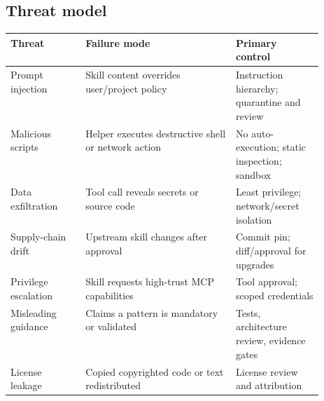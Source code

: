 \documentclass[11pt,letterpaper]{article}
\begin{document}
\subsection{Threat model}
\begin{tabularx}{\linewidth}{@{}p{0.24\linewidth}X p{0.28\linewidth}@{}}
\toprule
\textbf{Threat} & \textbf{Failure mode} & \textbf{Primary control}\\\midrule
Prompt injection & Skill content overrides user/project policy & Instruction hierarchy; quarantine and review\\
Malicious scripts & Helper executes destructive shell or network action & No auto-execution; static inspection; sandbox\\
Data exfiltration & Tool call reveals secrets or source code & Least privilege; network/secret isolation\\
Supply-chain drift & Upstream skill changes after approval & Commit pin; diff/approval for upgrades\\
Privilege escalation & Skill requests high-trust MCP capabilities & Tool approval; scoped credentials\\
Misleading guidance & Claims a pattern is mandatory or validated & Tests, architecture review, evidence gates\\
License leakage & Copied copyrighted code or text redistributed & License review and attribution\\
\bottomrule
\end{tabularx}
\end{document}

